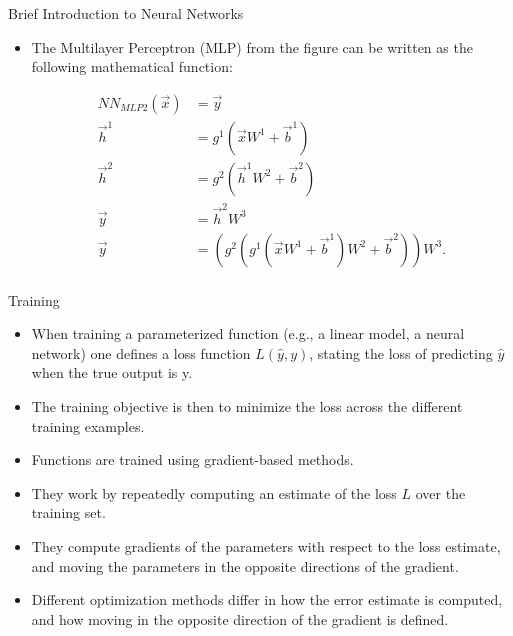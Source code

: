 \documentclass[handout]{beamer}
\begin{document}
\begin{frame}{Brief Introduction to Neural Networks}
\begin{scriptsize}
\begin{itemize}
\item The Multilayer Perceptron (MLP) from the figure can be written as the following mathematical function:
\begin{center}
\begin{equation}
\begin{split}
NN_{MLP2}(\vec{x}) & =  \vec{y}  \\
\vec{h}^{1} &  = g^{1}(\vec{x}W^{1}+\vec{b}^{1}) \\
\vec{h}^{2} &  = g^{2}(\vec{h}^{1}W^{2}+\vec{b}^{2}) \\
\vec{y} &  = \vec{h}^{2}W^{3}\\
\vec{y} &  = (g^2(g^1(\vec{x}W^{1}+\vec{b}^{1})W^2+\vec{b}^2))W^3.\\
\end{split}
\end{equation}
\end{center}

\end{itemize}


\end{scriptsize}
\end{frame}




\begin{frame}{Training}
\begin{scriptsize}
\begin{itemize}
\item  When training a parameterized function (e.g., a linear model, a neural network) one defines a loss function $L(\hat{y}, y)$, stating the loss of predicting $\hat{y}$ when the true output is y.

\item The training objective is then to minimize the loss across the different training examples. 

\item Functions are trained using  gradient-based methods.

\item They work by repeatedly computing an estimate of the loss $L$ over the training set.

\item They compute gradients of the parameters with respect to the loss estimate, and moving the parameters in the opposite directions of the gradient. 

\item Different optimization methods differ in how the error estimate is computed, and how moving in the opposite direction of the gradient is defined.

\end{itemize}


\end{scriptsize}
\end{frame}
\end{document}
